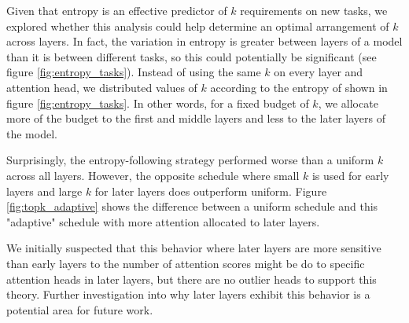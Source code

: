 Given that entropy is an effective predictor of $k$ requirements on new tasks, we explored whether this analysis could help determine an optimal arrangement of $k$ across layers. In fact, the variation in entropy is greater between layers of a model than it is between different tasks, so this could potentially be significant (see figure \ref{fig:entropy_tasks}). Instead of using the same $k$ on every layer and attention head, we distributed values of $k$ according to the entropy of shown in figure \ref{fig:entropy_tasks}. In other words, for a fixed budget of $k$, we allocate more of the budget to the first and middle layers and less to the later layers of the model.

 Surprisingly, the entropy-following strategy performed worse than a uniform $k$ across all layers. However, the opposite schedule where small $k$ is used for early layers and large $k$ for later layers does outperform uniform. Figure \ref{fig:topk_adaptive} shows the difference between a uniform schedule and this "adaptive" schedule with more attention allocated to later layers. 

 We initially suspected that this behavior where later layers are more sensitive than early layers to the number of attention scores might be do to specific attention heads in later layers, but there are no outlier heads to support this theory. Further investigation into why later layers exhibit this behavior is a potential area for future work.
 

